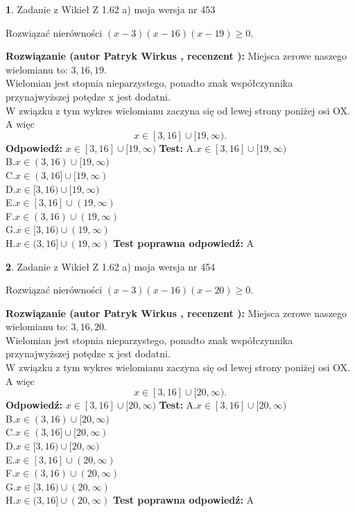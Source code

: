 \documentclass[12pt, a4paper]{article}
\theoremstyle{definition} %
\newtheorem{zad}{}
\newcommand{\zadStart}[1]{\begin{zad}#1\newline}
\newcommand{\zadStop}{\end{zad}}
\newcommand{\rozwStart}[2]{\noindent \textbf{Rozwiązanie (autor #1 , recenzent #2): }\newline}
\newcommand{\rozwStop}{\newline}
\newcommand{\odpStart}{\noindent \textbf{Odpowiedź:}\newline}
\newcommand{\odpStop}{\newline}
\newcommand{\testStart}{\noindent \textbf{Test:}\newline}
\newcommand{\testStop}{\newline}
\newcommand{\kluczStart}{\noindent \textbf{Test poprawna odpowiedź:}\newline}
\newcommand{\kluczStop}{\newline}
\begin{document}
\zadStart{Zadanie z Wikieł Z 1.62 a) moja wersja nr 453}

Rozwiązać nierówności $(x-3)(x-16)(x-19)\ge0$.
\zadStop
\rozwStart{Patryk Wirkus}{}
Miejsca zerowe naszego wielomianu to: $3, 16, 19$.\\
Wielomian jest stopnia nieparzystego, ponadto znak współczynnika przy\linebreak najwyższej potędze x jest dodatni.\\ W związku z tym wykres wielomianu zaczyna się od lewej strony poniżej osi OX. A więc $$x \in [3,16] \cup [19,\infty).$$
\rozwStop
\odpStart
$x \in [3,16] \cup [19,\infty)$
\odpStop
\testStart
A.$x \in [3,16] \cup [19,\infty)$\\
B.$x \in (3,16) \cup [19,\infty)$\\
C.$x \in (3,16] \cup [19,\infty)$\\
D.$x \in [3,16) \cup [19,\infty)$\\
E.$x \in [3,16] \cup (19,\infty)$\\
F.$x \in (3,16) \cup (19,\infty)$\\
G.$x \in [3,16) \cup (19,\infty)$\\
H.$x \in (3,16] \cup (19,\infty)$
\testStop
\kluczStart
A
\kluczStop



\zadStart{Zadanie z Wikieł Z 1.62 a) moja wersja nr 454}

Rozwiązać nierówności $(x-3)(x-16)(x-20)\ge0$.
\zadStop
\rozwStart{Patryk Wirkus}{}
Miejsca zerowe naszego wielomianu to: $3, 16, 20$.\\
Wielomian jest stopnia nieparzystego, ponadto znak współczynnika przy\linebreak najwyższej potędze x jest dodatni.\\ W związku z tym wykres wielomianu zaczyna się od lewej strony poniżej osi OX. A więc $$x \in [3,16] \cup [20,\infty).$$
\rozwStop
\odpStart
$x \in [3,16] \cup [20,\infty)$
\odpStop
\testStart
A.$x \in [3,16] \cup [20,\infty)$\\
B.$x \in (3,16) \cup [20,\infty)$\\
C.$x \in (3,16] \cup [20,\infty)$\\
D.$x \in [3,16) \cup [20,\infty)$\\
E.$x \in [3,16] \cup (20,\infty)$\\
F.$x \in (3,16) \cup (20,\infty)$\\
G.$x \in [3,16) \cup (20,\infty)$\\
H.$x \in (3,16] \cup (20,\infty)$
\testStop
\kluczStart
A
\kluczStop
\end{document}
